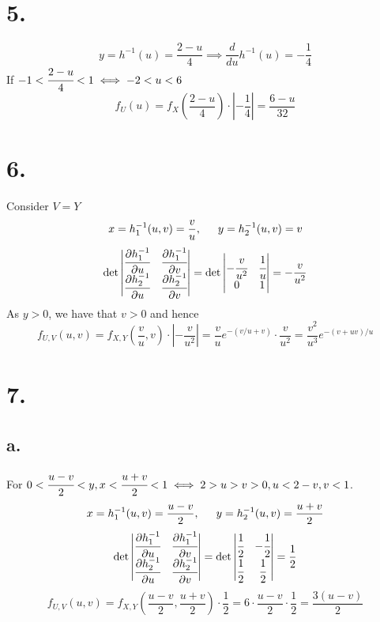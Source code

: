 \documentclass[11pt]{article}
\begin{document}
\section*{5.}
\[
    y = h^{-1}(u) = \frac{2-u}{4} \implies \frac{d}{du}h^{-1}(u) = -\frac{1}{4}    
\]
If $-1<\cfrac{2-u}{4}< 1 \iff -2<u<6$
\[
    f_U(u) = f_X\left(\frac{2-u}{4}\right) \cdot \left|-\frac{1}{4}\right| = \frac{6-u}{32} 
\]
\pagebreak
\section*{6.}
Consider $V=Y$
\[
    x = h_1^{-1}(u,v) = \frac{v}{u}, \indent  y = h_2^{-1}(u,v) = v
\]
\[
    \det 
    \begin{vmatrix}
        \cfrac{\partial h_1^{-1}}{\partial u} & \cfrac{\partial h_1^{-1}}{\partial v} \\
        \cfrac{\partial h_2^{-1}}{\partial u} & \cfrac{\partial h_2^{-1}}{\partial v}
    \end{vmatrix}    
    = 
    \det 
    \begin{vmatrix}
        -\cfrac{v}{u^2} & \cfrac{1}{u} \\
        0 & 1 
    \end{vmatrix}
    = -\frac{v}{u^2}
\]
As $y>0$, we have that $v>0$ and hence 
\[
    f_{U,V}(u,v) = f_{X,Y}\left(\frac{v}{u}, v\right) \cdot \left| -\frac{v}{u^2} \right| =  
    \frac{v}{u} e^{-(v/u + v)} \cdot \frac{v}{u^2} = \frac{v^2}{u^3}e^{-(v+uv)/u} 
\]
\pagebreak
\section*{7.}
\subsection*{a.}
For $0<\cfrac{u-v}{2}<y, x<\cfrac{u+v}{2}<1 \iff 2>u>v>0, u<2-v, v<1$.
\[
    x = h_1^{-1}(u,v) = \frac{u-v}{2}, \indent y = h_2^{-1}(u,v) = \frac{u+v}{2}    
\]
\[
    \det 
    \begin{vmatrix}
        \cfrac{\partial h_1^{-1}}{\partial u} & \cfrac{\partial h_1^{-1}}{\partial v} \\
        \cfrac{\partial h_2^{-1}}{\partial u} & \cfrac{\partial h_2^{-1}}{\partial v}
    \end{vmatrix}    
    = 
    \det 
    \begin{vmatrix}
        \cfrac{1}{2} & -\cfrac{1}{2} \\
        \cfrac{1}{2} & \cfrac{1}{2} 
    \end{vmatrix}
    = \frac{1}{2}
\]
\[
    f_{U,V}(u,v) = f_{X,Y}\left( \frac{u-v}{2}, \frac{u+v}{2}\right) \cdot \frac{1}{2} 
    = 6 \cdot \frac{u-v}{2} \cdot \frac{1}{2} = \frac{3(u-v)}{2}     
\]
\end{document}
